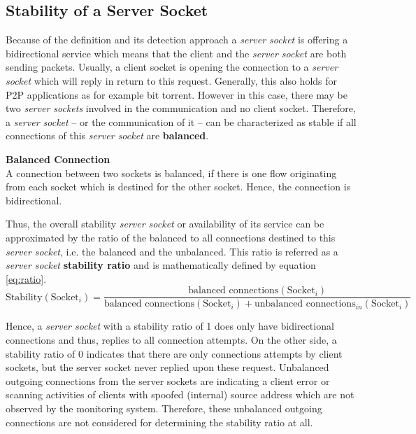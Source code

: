 \subsection{Stability of a Server Socket} Because of the definition and its detection approach a \emph{server socket} is offering a bidirectional service which means that the client and the \emph{server socket} are both sending packets. Usually, a client socket is opening the connection to a \emph{server socket} which will reply in return to this request. Generally, this also holds for P2P applications as for example bit torrent. However in this case, there may be two \emph{server sockets} involved in the communication and no client socket. Therefore, a \emph{server socket} -- or the communication of it -- can be characterized as stable if all connections of this \emph{server socket} are \textbf{balanced}. 

\parbox{ 
\textwidth}{ 
\begin{defn}
	{\textbf{Balanced Connection}\\} A connection between two sockets is balanced, if there is one flow originating from each socket which is destined for the other socket. Hence, the connection is bidirectional. 
\end{defn}
}

Thus, the overall stability \emph{server socket} or availability of its service can be approximated by the ratio of the balanced to all connections destined to this \emph{server socket}, i.e. the balanced and the unbalanced. This ratio is referred as a \emph{server socket} \textbf{stability ratio} and is mathematically defined by equation \ref{eq:ratio}. 
\begin{equation}
	\text{Stability}(\text{Socket}_i) = \frac{\text{balanced connections}(\text{Socket}_i)}{\text{balanced connections}(\text{Socket}_i) + \text{unbalanced connections}_{in}(\text{Socket}_i)} 
	\label{eq:ratio} 
\end{equation}

Hence, a \emph{server socket} with a stability ratio of 1 does only have bidirectional connections and thus, replies to all connection attempts. On the other side, a stability ratio of 0 indicates that there are only connections attempts by client sockets, but the server socket never replied upon these request. Unbalanced outgoing connections from the server sockets are indicating a client error or scanning activities of clients with spoofed (internal) source address which are not observed by the monitoring system. Therefore, these unbalanced outgoing connections are not considered for determining the stability ratio at all.

